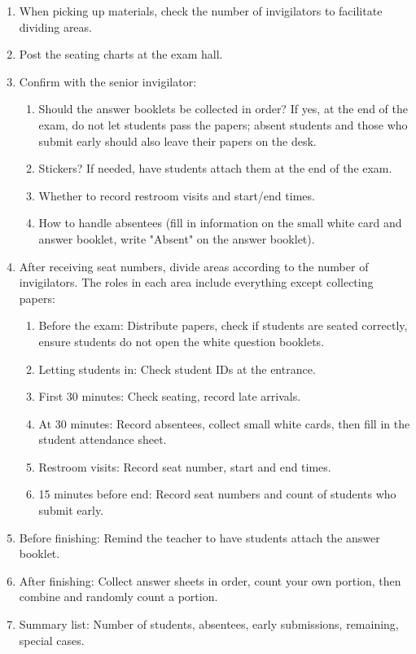 \begin{enumerate}
    \item When picking up materials, check the number of invigilators to facilitate dividing areas.
    \item Post the seating charts at the exam hall.
    \item Confirm with the senior invigilator:
    \begin{enumerate}
        \item Should the answer booklets be collected in order? If yes, at the end of the exam, do not let students pass the papers; absent students and those who submit early should also leave their papers on the desk.
        \item Stickers? If needed, have students attach them at the end of the exam.
        \item Whether to record restroom visits and start/end times.
        \item How to handle absentees (fill in information on the small white card and answer booklet, write "Absent" on the answer booklet).
    \end{enumerate}
    \item After receiving seat numbers, divide areas according to the number of invigilators. The roles in each area include everything except collecting papers:
    \begin{enumerate}
        \item Before the exam: Distribute papers, check if students are seated correctly, ensure students do not open the white question booklets.
        \item Letting students in: Check student IDs at the entrance.
        \item First 30 minutes: Check seating, record late arrivals.
        \item At 30 minutes: Record absentees, collect small white cards, then fill in the student attendance sheet.
        \item Restroom visits: Record seat number, start and end times.
        \item 15 minutes before end: Record seat numbers and count of students who submit early.
    \end{enumerate}
    \item Before finishing: Remind the teacher to have students attach the answer booklet.
    \item After finishing: Collect answer sheets in order, count your own portion, then combine and randomly count a portion.
    \item Summary list: Number of students, absentees, early submissions, remaining, special cases.
\end{enumerate}


